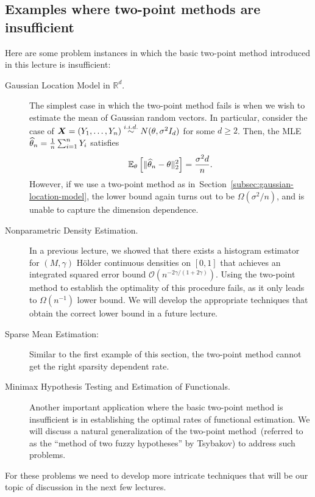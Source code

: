 \documentclass[12pt]{article}
\begin{document}
\subsection{Examples where two-point methods are insufficient}

Here are some problem instances in which the basic two-point method introduced in this lecture is insufficient:

\begin{description}
	\item[Gaussian Location Model in $\mathbb{R}^d$.]
	The simplest case in which the two-point method fails is when we wish to estimate the mean of Gaussian random vectors. In particular, consider the case of ${\boldsymbol X} = (Y_1, \ldots, Y_n) \stackrel{i.i.d.}{\sim} N(\theta, \sigma^2 I_d)$ for some $d\geq 2$. Then, the MLE $\widehat{\theta}_n = \frac{1}{n} \sum_{i=1}^n Y_i$ satisfies 
	\begin{align}
	\mathbb{E}_{\theta} \left[ \|\widehat{\theta}_n - \theta\|_2^2 \right] = \frac{\sigma^2 d}{n}. 
	\end{align}
	However, if we use a two-point method as in~Section~\ref{subsec:gaussian-location-model}, the lower bound again turns out to be $\Omega(\sigma^2/n)$, and is unable to capture the dimension dependence.
	
	\item[Nonparametric Density Estimation.] In a previous lecture, we showed that there exists a histogram estimator for $(M, \gamma)$ H\"older continuous densities on $[0,1]$ that achieves an integrated squared error bound $\mathcal{O}(n^{-2\gamma/(1+2\gamma)})$. Using the two-point method to establish the optimality of this procedure fails, as it only leads to $\Omega(n^{-1})$ lower bound. We will develop the appropriate techniques that obtain the correct lower bound in a future lecture.   

	\item[Sparse Mean Estimation:] Similar to the first example of this section, the two-point method cannot get the right sparsity dependent rate. 

	\item[Minimax Hypothesis Testing and Estimation of Functionals.] Another important application where the basic two-point method is insufficient is in establishing the optimal rates of functional estimation. We will discuss a natural generalization of the two-point method~(referred to as the ``method of two fuzzy hypotheses'' by Tsybakov) to address such problems. 


\end{description}
For these problems we need to develop more intricate techniques that will be our topic of discussion in the next few lectures. 
\end{document}
